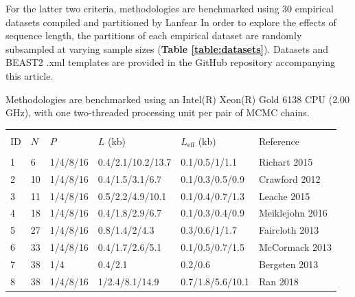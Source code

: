 \documentclass[10pt,letterpaper]{article}
\begin{document}
For the latter two criteria, methodologies are benchmarked using 30 empirical datasets compiled and partitioned \cite{lanfear2016partitionfinder} by Lanfear \cite{lanfear2019Github} In order to explore the effects of sequence length, the partitions of each empirical dataset are randomly subsampled at varying sample sizes (\textbf{Table \ref{table:datasets}}). Datasets and BEAST2 .xml templates are provided in the GitHub repository accompanying this article.


Methodologies are benchmarked using an Intel(R) Xeon(R) Gold 6138 CPU (2.00 GHz), with one two-threaded processing unit per pair of MCMC chains.




\begin{table}[h!]
\centering
\begin{tabular}{|l| l l l l l|} 
 \hline
  &&&&& \\
 ID & $N$ & $P$ & $L$ (kb) & $L_\text{eff}$ (kb) & Reference \\
 &&&&& \\
 
 1  &  6  &  1/4/8/16  &  0.4/2.1/10.2/13.7  &  0.1/0.5/1/1.1  &  Richart 2015 \cite{Richart_2016} \\ 

2  &  10  &  1/4/8/16  &  0.4/1.5/3.1/6.7  &  0.1/0.3/0.5/0.9  &  Crawford 2012 \cite{Crawford_2012} \\ 

3  &  11  &  1/4/8/16  &  0.5/2.2/4.9/10.1  &  0.1/0.4/0.7/1.3  &  Leache 2015 \cite{Leache_2015} \\ 

4  &  18  &  1/4/8/16  &  0.4/1.8/2.9/6.7  &  0.1/0.3/0.4/0.9  &  Meiklejohn 2016 \cite{Meiklejohn_2016} \\ 

5  &  27  &  1/4/8/16  &  0.8/1.4/2/4.3  &  0.3/0.6/1/1.7  &  Faircloth 2013 \cite{Faircloth_2013} \\ 

6  &  33  &  1/4/8/16  &  0.4/1.7/2.6/5.1  &  0.1/0.5/0.7/1.5  &  McCormack 2013 \cite{McCormack_2013} \\ 

7  &  38  &  1/4  &  0.4/2.1  &  0.2/0.6  &  Bergsten 2013 \cite{Bergsten_2013} \\ 

8  &  38  &  1/4/8/16  &  1/2.4/8.1/14.9  &  0.7/1.8/5.6/10.1  &  Ran 2018 \cite{Ran_2018} \\ 


\end{tabular}
\end{table}
\end{document}

